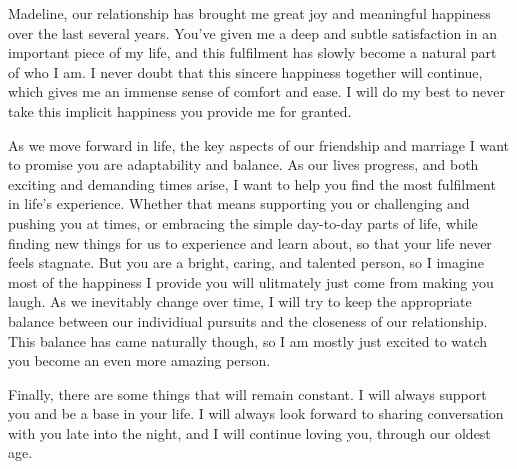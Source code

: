 \documentclass[18pt]{letter}
\begin{document}
    

\large

Madeline, our relationship has brought me great joy and meaningful happiness
over the last several years.  You've given me a deep and subtle satisfaction in an important
piece of my life, and this fulfilment has slowly become a natural part of who I am.  I never doubt that this sincere
happiness together will continue, which gives me an immense sense of
comfort and ease.  I will do my best to never take this implicit happiness you provide 
me for granted.  

As we move forward in life, the key aspects of our friendship and marriage I want to promise you are
adaptability and balance.  As our lives progress, and
both exciting and demanding times arise, I want to help you find the most fulfilment in life's experience.  Whether that means supporting you or challenging
and pushing you at times, or embracing the simple day-to-day parts of life, while finding
new things for us to experience and learn about, so that your life never feels
stagnate.  But you are a bright, caring, and
talented person, so I imagine most of the happiness I provide you will ulitmately just come from making you laugh. As we inevitably change over
time, I will try to keep the appropriate balance between our
individiual pursuits and the closeness of our relationship.  This balance has came naturally though, so I am mostly just
excited to watch you become an even more amazing person.

Finally, there are some things that will remain constant.  I will always
support you and be a base in your life.  I will always look
forward to sharing conversation with you late into the night, and I will continue loving you, through our oldest age.
\end{document}
